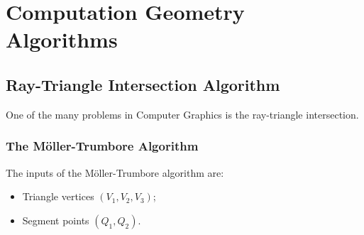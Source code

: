 \chapter{Computation Geometry Algorithms}
\label{Geom_Algos}
%
\section{Ray-Triangle Intersection Algorithm}
One of the many problems in Computer Graphics is the ray-triangle intersection.
%
\subsection{The M\"oller-Trumbore Algorithm}
%
The inputs of the  M\"oller-Trumbore algorithm are:
\begin{itemize}
	\item Triangle vertices $(V_1, V_2, V_3)$;
	\item Segment points $(Q_1, Q_2)$.
\end{itemize}
%
\noindent
